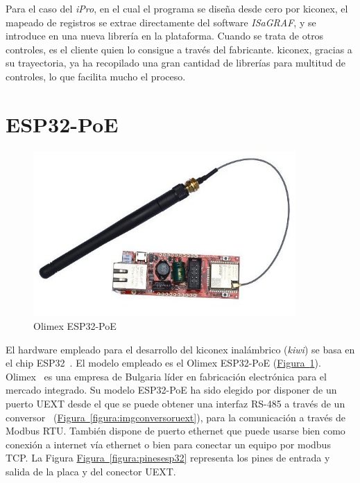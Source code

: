 Para el caso del \textit{iPro}, en el cual el programa se diseña desde cero por kiconex, el mapeado de registros se extrae directamente del software \textit{ISaGRAF}, y se introduce en una nueva librería en la plataforma. Cuando se trata de otros controles, es el cliente quien lo consigue a través del fabricante. kiconex, gracias a su trayectoria, ya ha recopilado una gran cantidad de librerías para multitud de controles, lo que facilita mucho el proceso.


\section{ESP32-PoE}
\label{sec:esp32poe}

\begin{figure}[H]
  \centering
  \includegraphics[width=10cm, keepaspectratio]{img/ESP32-POE}
  \caption{Olimex ESP32-PoE}
  \label{figura:imgesp32}
\end{figure}

El hardware empleado para el desarrollo del kiconex inalámbrico (\textit{kiwi}) se basa en el chip ESP32~\cite{esp32Espressif}. El modelo empleado es el Olimex ESP32-PoE (\hyperref[figura:imgesp32]{Figura~\ref{figura:imgesp32}}). Olimex~\cite{olimexEsp32product} es una empresa de Bulgaria líder en fabricación electrónica para el mercado integrado. Su modelo ESP32-PoE ha sido elegido por disponer de un puerto UEXT desde el que se puede obtener una interfaz RS-485 a través de un conversor~\cite{conversorUextProduct} (\hyperref[figura:imgconversoruext]{Figura~\ref{figura:imgconversoruext}}), para la comunicación a través de Modbus RTU. También dispone de puerto ethernet que puede usarse bien como conexión a internet vía ethernet o bien para conectar un equipo por modbus TCP. La Figura \hyperref[figura:pinesesp32]{Figura~\ref{figura:pinesesp32}} representa los pines de entrada y salida de la placa y del conector UEXT.

